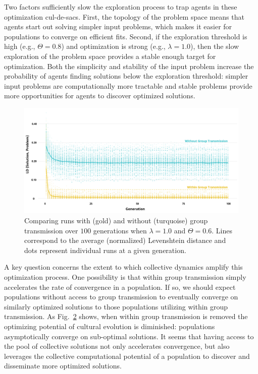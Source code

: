\documentclass{article}
\begin{document}
\begin{figure}[H]
    \label{fig:LD}
\end{figure}

Two factors sufficiently slow the exploration process to trap agents in these optimization cul-de-sacs. First, the topology of the problem space means that agents start out solving simpler input problems, which makes it easier for populations to converge on efficient fits. Second, if the exploration threshold is high (e.g., $\Theta=0.8$) and optimization is strong (e.g., $\lambda=1.0$), then the slow exploration of the problem space provides a stable enough target for optimization. Both the simplicity and stability of the input problem increase the probability of agents finding solutions below the exploration threshold: simpler input problems are computationally more tractable and stable problems provide more opportunities for agents to discover optimized solutions.

\begin{figure}[H]
\begin{center}
    \includegraphics[width=\linewidth]{LD_optimal.png}
\end{center}
    \caption{Comparing runs with (gold) and without (turquoise) group transmission over $100$ generations when $\lambda=1.0$ and $\Theta=0.6$. Lines correspond to the average (normalized) Levenshtein distance and dots represent individual runs at a given generation.}
    \label{fig:LD_opt}
\end{figure}

A key question concerns the extent to which collective dynamics amplify this optimization process. One possibility is that within group transmission simply accelerates the rate of convergence in a population. If so, we should expect populations without access to group transmission to eventually converge on similarly optimized solutions to those populations utilizing within group transmission. As Fig.~\ref{fig:LD_opt} shows, when within group transmission is removed the optimizing potential of cultural evolution is diminished: populations asymptotically converge on sub-optimal solutions. It seems that having access to the pool of collective solutions not only accelerates convergence, but also leverages the collective computational potential of a population to discover and disseminate more optimized solutions.
\end{document}
